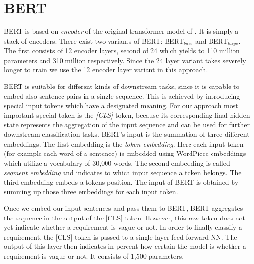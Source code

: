 \section{BERT}
\label{chp:approach:sec:models:subsec:BERT}

\Ac{BERT} is based on \textit{encoder} of the original transformer model of \textcite{Vaswani:2017}.
It is simply a stack of encoders.
There exist two variants of \ac{BERT}: \ac{BERT}$_{base}$ and \ac{BERT}$_{large}$.
The first consists of 12 encoder layers, second of 24 which yields to 110 million parameters and 310 million respectively.
Since the 24 layer variant takes severely longer to train we use the 12 encoder layer variant in this approach. \parencite{Devlin:2018}

\Ac{BERT} is suitable for different kinds of downstream tasks, since it is capable to embed also sentence pairs in a single sequence.
This is achieved by introducing special input tokens which have a designated meaning.
For our approach most important special token is the \textit{[CLS]} token, because its corresponding final hidden state represents the aggregation of the input sequence and can be used for further downstream classification tasks.
\Ac{BERT}'s input is the summation of three different embeddings.
The first embedding is the \textit{token embedding}.
Here each input token (for example each word of a sentence) is embedded using WordPiece embeddings \parencite{Wu:2016} which utilize a vocabulary of 30,000 words.
The second embedding is called \textit{segment embedding} and indicates to which input sequence a token belongs.
The third embedding embeds a tokens position.
The input of \ac{BERT} is obtained by summing up those three embeddings for each input token.

Once we embed our input sentences and pass them to \ac{BERT}, \ac{BERT} aggregates the sequence in the output of the [CLS] token.
However, this raw token does not yet indicate whether a requirement is vague or not.
In order to finally classify a requirement, the [CLS] token is passed to a single layer feed forward \ac{NN}.
The output of this layer then indicates in percent how certain the model is whether a requirement is vague or not.
It consists of 1,500 parameters.
